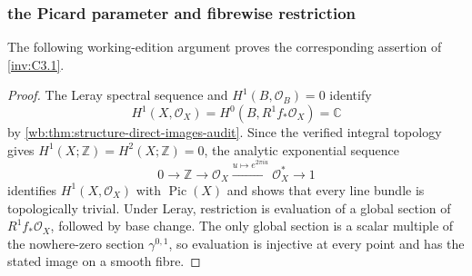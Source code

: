 \subsubsection{the Picard parameter and fibrewise restriction}\label{inv:wbproof:cor:picard-line-audit}
The following working-edition argument proves the corresponding assertion of \cref{inv:C3.1}.


\begin{proof}
The Leray spectral sequence and \(H^1(B,\mathcal O_B)=0\) identify
\[
 H^1(X,\mathcal O_X)=H^0(B,R^1f_*\mathcal O_X)=\mathbb C
\]
by \cref{wb:thm:structure-direct-images-audit}.  Since the verified integral
topology gives \(H^1(X;\mathbb Z)=H^2(X;\mathbb Z)=0\), the analytic
exponential sequence
\[
0\to\mathbb Z\to\mathcal O_X
 \xrightarrow{u\mapsto e^{2\pi iu}}\mathcal O_X^*\to1
\]
identifies \(H^1(X,\mathcal O_X)\) with \(\operatorname{Pic}(X)\) and
shows that every line bundle is topologically trivial.  Under Leray,
restriction is evaluation of a global section of
\(R^1f_*\mathcal O_X\), followed by base change.  The only global section
is a scalar multiple of the nowhere-zero section \(\gamma^{0,1}\), so
evaluation is injective at every point and has the stated image on a
smooth fibre.
\end{proof}


